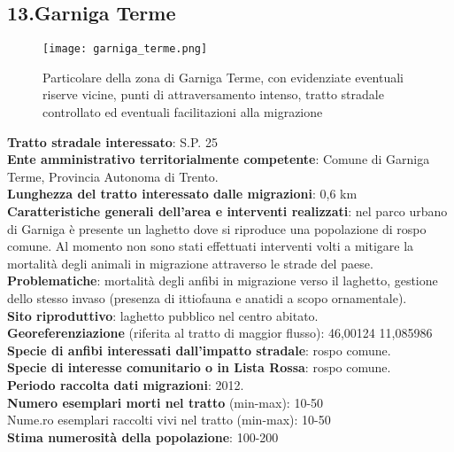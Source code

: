 \documentclass[11pt,a4paper,twoside]{memoir}
\begin{document}
\newpage
\begin{tcolorbox}[breakable,colback=white,colframe=green,width=10cm]
\subsection{13.Garniga Terme}
\end{tcolorbox}

\begin{figure}[H]
\label{fig:map_garniga_terme}
\centering
  \texttt{[image: garniga\_terme.png]}
\caption{Particolare della zona di Garniga Terme, con evidenziate eventuali riserve vicine, punti di attraversamento intenso, tratto stradale controllato ed eventuali facilitazioni alla migrazione}
\end{figure}

\textbf{Tratto stradale interessato}: S.P. 25 \\
\textbf{Ente amministrativo territorialmente competente}: Comune di Garniga Terme, Provincia Autonoma di Trento.  \\
\textbf{Lunghezza del tratto interessato dalle migrazioni}: 0,6 km \\
\textbf{Caratteristiche generali dell’area e interventi realizzati}: nel parco urbano di Garniga è presente un laghetto dove si riproduce una  popolazione di rospo comune. Al momento non sono stati effettuati interventi volti a mitigare la mortalità degli animali in migrazione attraverso le strade del paese. \\
\textbf{Problematiche}: mortalità degli anfibi in migrazione verso il laghetto, gestione dello stesso invaso (presenza di ittiofauna e anatidi a scopo ornamentale). \\
\textbf{Sito riproduttivo}: laghetto pubblico nel centro abitato. \\
\textbf{Georeferenziazione} (riferita al tratto di maggior flusso): 46,00124 11,085986 \\
\textbf{Specie di anfibi interessati dall’impatto stradale}: rospo comune. \\
\textbf{Specie di interesse comunitario o in Lista Rossa}: rospo comune. \\
\textbf{Periodo raccolta dati migrazioni}: 2012. \\
\textbf{Numero esemplari morti nel tratto} (min-max): 10-50 \\
Nume.ro esemplari raccolti vivi nel tratto (min-max): 10-50 \\
\textbf{Stima numerosità della popolazione}: 100-200 \\
\end{document}

